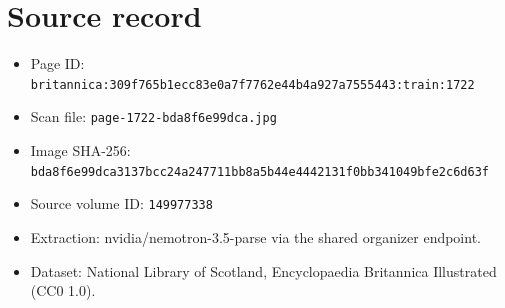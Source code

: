\documentclass{article}
\begin{document}
\section*{Source record}
\begin{itemize}
\item Page ID: \texttt{britannica:309f765b1ecc83e0a7f7762e44b4a927a7555443:train:1722}
\item Scan file: \texttt{page-1722-bda8f6e99dca.jpg}
\item Image SHA-256: \texttt{bda8f6e99dca3137bcc24a247711bb8a5b44e4442131f0bb341049bfe2c6d63f}
\item Source volume ID: \texttt{149977338}
\item Extraction: nvidia/nemotron-3.5-parse via the shared organizer endpoint.
\item Dataset: National Library of Scotland, Encyclopaedia Britannica Illustrated (CC0 1.0).
\end{itemize}
\end{document}
